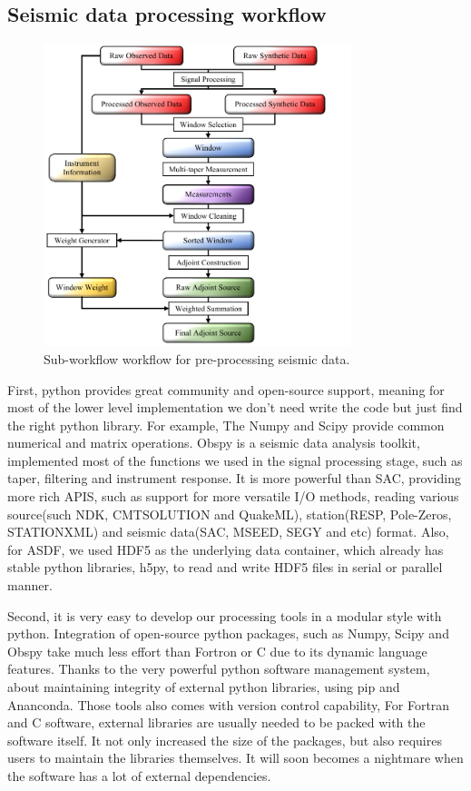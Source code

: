 \subsection{Seismic data processing workflow}
\begin{figure}
  \centering
  \includegraphics[width=0.8\textwidth]{ch-GLADM25/figures/Preprocess_workflow.pdf}
  \caption[Sub-workflow workflow for pre-processing seismic data]
  {\small{Sub-workflow workflow for pre-processing seismic data.}}
  \label{fig:preprocess_workflow}
\end{figure}

First, python provides great community and open-source support, meaning for most
of the lower level implementation we don't need write the code but
just find the right python library. For example,
The Numpy and Scipy provide common numerical and matrix operations.
Obspy is a seismic data analysis toolkit, implemented
most of the functions we used in the signal processing stage, such as taper, filtering
and instrument response. It is more powerful than SAC,
providing more rich APIS, such as support for more versatile I/O methods, reading
various source(such NDK, CMTSOLUTION and QuakeML), station(RESP, Pole-Zeros, STATIONXML)
and seismic data(SAC, MSEED, SEGY and etc) format.
Also, for ASDF, we used HDF5 as the underlying data container, which already has
stable python libraries, h5py, to read and write HDF5 files in serial or parallel manner.

Second, it is very easy to develop our processing tools in a modular style with python.
Integration of open-source python packages, such as Numpy, Scipy and Obspy take much
less effort than Fortron or C due to its dynamic language features.
Thanks to the very powerful python software management system,
about maintaining integrity of external python libraries, using pip and Ananconda.
Those tools also comes with version control capability,
For Fortran and C software, external libraries
are usually needed to be packed with the software itself. It not only increased the size
of the packages, but also requires users to maintain the libraries themselves. It will
 soon becomes a nightmare when the software has a lot of external dependencies.

